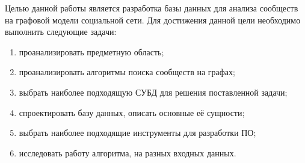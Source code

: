 
Целью данной работы является разработка базы данных для анализа сообществ на графовой модели социальной сети. Для достижения данной цели необходимо выполнить следующие задачи:

\begin{enumerate}
\item проанализировать предметную область;
\item проанализировать алгоритмы поиска сообществ на графах;
\item выбрать наиболее подходящую СУБД для решения поставленной задачи;
\item спроектировать базу данных, описать основные её сущности;
\item выбрать наиболее подходящие инструменты для разработки ПО;
\item исследовать работу алгоритма, на разных входных данных.
\end{enumerate}